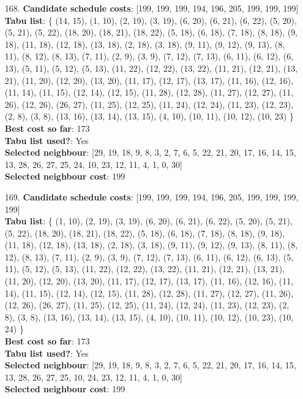 \documentclass[fleqn]{article}
\begin{document}
\begin{itemize}
    \item[168.] \textbf{Candidate schedule costs}: [199, 199, 199, 194, 196, 205, 199, 199, 199] \\
    \textbf{Tabu list}: \{ (14, 15), (1, 10), (2, 19), (3, 19), (6, 20), (6, 21), (6, 22), (5, 20), (5, 21), (5, 22), (18, 20), (18, 21), (18, 22), (5, 18), (6, 18), (7, 18), (8, 18), (9, 18), (11, 18), (12, 18), (13, 18), (2, 18), (3, 18), (9, 11), (9, 12), (9, 13), (8, 11), (8, 12), (8, 13), (7, 11), (2, 9), (3, 9), (7, 12), (7, 13), (6, 11), (6, 12), (6, 13), (5, 11), (5, 12), (5, 13), (11, 22), (12, 22), (13, 22), (11, 21), (12, 21), (13, 21), (11, 20), (12, 20), (13, 20), (11, 17), (12, 17), (13, 17), (11, 16), (12, 16), (11, 14), (11, 15), (12, 14), (12, 15), (11, 28), (12, 28), (11, 27), (12, 27), (11, 26), (12, 26), (26, 27), (11, 25), (12, 25), (11, 24), (12, 24), (11, 23), (12, 23), (2, 8), (3, 8), (13, 16), (13, 14), (13, 15), (4, 10), (10, 11), (10, 12), (10, 23) \} \\
    \textbf{Best cost so far}: 173 \\
    \textbf{Tabu list used?}: Yes \\
    \textbf{Selected neighbour}: [29, 19, 18, 9, 8, 3, 2, 7, 6, 5, 22, 21, 20, 17, 16, 14, 15, 13, 28, 26, 27, 25, 24, 10, 23, 12, 11, 4, 1, 0, 30] \\
    \textbf{Selected neighbour cost}: 199
      

    \item[169.] \textbf{Candidate schedule costs}: [199, 199, 199, 194, 196, 205, 199, 199, 199, 199] \\
    \textbf{Tabu list}: \{ (1, 10), (2, 19), (3, 19), (6, 20), (6, 21), (6, 22), (5, 20), (5, 21), (5, 22), (18, 20), (18, 21), (18, 22), (5, 18), (6, 18), (7, 18), (8, 18), (9, 18), (11, 18), (12, 18), (13, 18), (2, 18), (3, 18), (9, 11), (9, 12), (9, 13), (8, 11), (8, 12), (8, 13), (7, 11), (2, 9), (3, 9), (7, 12), (7, 13), (6, 11), (6, 12), (6, 13), (5, 11), (5, 12), (5, 13), (11, 22), (12, 22), (13, 22), (11, 21), (12, 21), (13, 21), (11, 20), (12, 20), (13, 20), (11, 17), (12, 17), (13, 17), (11, 16), (12, 16), (11, 14), (11, 15), (12, 14), (12, 15), (11, 28), (12, 28), (11, 27), (12, 27), (11, 26), (12, 26), (26, 27), (11, 25), (12, 25), (11, 24), (12, 24), (11, 23), (12, 23), (2, 8), (3, 8), (13, 16), (13, 14), (13, 15), (4, 10), (10, 11), (10, 12), (10, 23), (10, 24) \} \\
    \textbf{Best cost so far}: 173 \\
    \textbf{Tabu list used?}: Yes \\
    \textbf{Selected neighbour}: [29, 19, 18, 9, 8, 3, 2, 7, 6, 5, 22, 21, 20, 17, 16, 14, 15, 13, 28, 26, 27, 25, 10, 24, 23, 12, 11, 4, 1, 0, 30] \\
    \textbf{Selected neighbour cost}: 199
      


\end{itemize}
\end{document}
